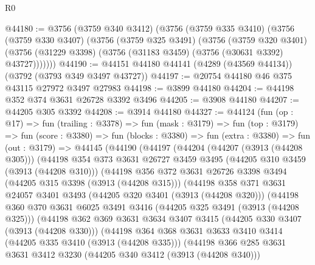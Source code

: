 \begin{lexlean}{R0}
\begin{coremodule}
@44180 := @3756
    (@3759 @340 @3412)
    (@3756
      (@3759 @335 @3410)
      (@3756
        (@3759 @330 @3407)
        (@3756
          (@3759 @325 @3491)
          (@3756
            (@3759 @320 @3401)
            (@3756 (@31229 @3398) (@3756 (@31183 @3459) (@3756 (@30631 @3392) @43727)))))))
@44190 := @44151 @44180 @44141 (@4289 (@43569 @44134)) (@3792 (@3793 @349 @3497 @43727))
@44197 := @20754 @44180 @46 @375 @43115 @27972 @3497 @27983
@44198 := @3899 @44180
@44204 := @44198 @352 @374 @3631 @26728 @3392 @3496
@44205 := @3908 @44180
@44207 := @44205 @305 @3392
@44208 := @3914 @44180
@44327 := @44124
    (fun (op : @17) =>
    fun (trailing : @3378) =>
    fun (mask : @3179) =>
    fun (top : @3179) =>
    fun (score : @3380) =>
    fun (blocks : @3380) =>
    fun (extra : @3380) =>
    fun (out : @3179) =>
    @44145
      (@44190
        (@44197
          (@44204
            (@44207 (@3913 (@44208 @305)))
            (@44198
              @354
              @373
              @3631
              @26727
              @3459
              @3495
              (@44205 @310 @3459 (@3913 (@44208 @310)))
              (@44198
                @356
                @372
                @3631
                @26726
                @3398
                @3494
                (@44205 @315 @3398 (@3913 (@44208 @315)))
                (@44198
                  @358
                  @371
                  @3631
                  @24057
                  @3401
                  @3493
                  (@44205 @320 @3401 (@3913 (@44208 @320)))
                  (@44198
                    @360
                    @370
                    @3631
                    @6025
                    @3491
                    @3416
                    (@44205 @325 @3491 (@3913 (@44208 @325)))
                    (@44198
                      @362
                      @369
                      @3631
                      @3634
                      @3407
                      @3415
                      (@44205 @330 @3407 (@3913 (@44208 @330)))
                      (@44198
                        @364
                        @368
                        @3631
                        @3633
                        @3410
                        @3414
                        (@44205 @335 @3410 (@3913 (@44208 @335)))
                        (@44198
                          @366
                          @285
                          @3631
                          @3631
                          @3412
                          @3230
                          (@44205 @340 @3412 (@3913 (@44208 @340)))

\end{coremodule}
\end{lexlean}
